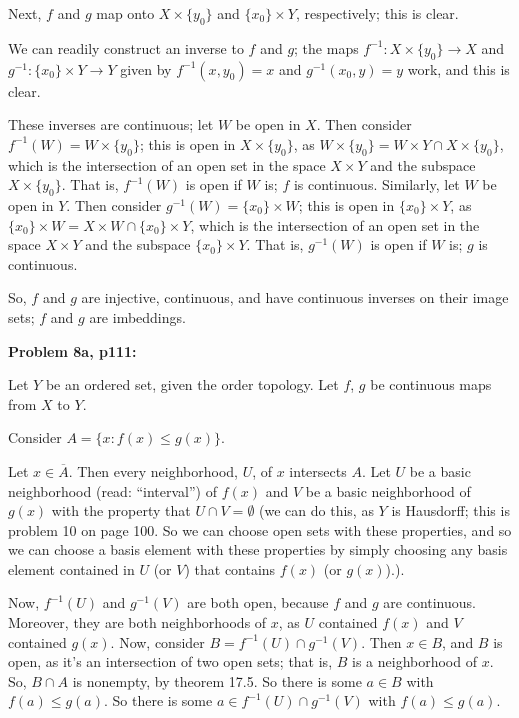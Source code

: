 \documentclass[a4paper,12pt]{article}
\begin{document}
Next, $f$ and $g$ map onto $X \times \{y_0\}$ and $\{x_0\} \times Y$, respectively; this is clear. %

We can readily construct an inverse to $f$ and $g$; the maps $f^{-1}: X \times \{y_0\} \to X$ and $g^{-1}: \{x_0\} \times Y \to Y$ given by $f^{-1}(x,y_0) = x$ and $g^{-1}(x_0,y) = y$ work, and this is clear.

These inverses are continuous; let $W$ be open in $X$. Then consider $f^{-1}(W) = W \times \{y_0\}$; this is open in $X \times \{y_0\}$, as $W \times \{y_0\} = W \times Y \cap X \times \{y_0\}$, which is the intersection of an open set in the space $X \times Y$ and the subspace $X \times \{y_0\}$. That is, $f^{-1}(W)$ is open if $W$ is; $f$ is continuous. Similarly, let $W$ be open in $Y$. Then consider $g^{-1}(W) = \{x_0\} \times W$; this is open in $\{x_0\} \times Y$, as $\{x_0\} \times W = X \times W \cap \{x_0\} \times Y$, which is the intersection of an open set in the space $X \times Y$ and the subspace $\{x_0\} \times Y$. That is, $g^{-1}(W)$ is open if $W$ is; $g$ is continuous.

So, $f$ and $g$ are injective, continuous, and have continuous inverses on their image sets; $f$ and $g$ are imbeddings. 


\shunt

{\bf Problem 8a, p111:}

Let $Y$ be an ordered set, given the order topology. Let $f$, $g$ be continuous maps from $X$ to $Y$.

Consider $A = \{x: f(x) \leq g(x)\}$.

Let $x \in \overline{A}$. Then every neighborhood, $U$, of $x$ intersects $A$. Let $U$ be a basic neighborhood (read: ``interval'') of $f(x)$ and $V$ be a basic neighborhood of $g(x)$ with the property that $U \cap V = \emptyset$ (we can do this, as $Y$ is Hausdorff; this is problem 10 on page 100. So we can choose open sets with these properties, and so we can choose a basis element with these properties by simply choosing any basis element contained in $U$ (or $V$) that contains $f(x)$ (or $g(x)$).). 

Now, $f^{-1}(U)$ and $g^{-1}(V)$ are both open, because $f$ and $g$ are continuous. Moreover, they are both neighborhoods of $x$, as $U$ contained $f(x)$ and $V$ contained $g(x)$. Now, consider $B = f^{-1}(U) \cap g^{-1}(V)$. Then $x \in B$, and $B$ is open, as it's an intersection of two open sets; that is, $B$ is a neighborhood of $x$. So, $B \cap A$ is nonempty, by theorem 17.5. So there is some $a \in B$ with $f(a) \leq g(a)$. So there is some $a \in f^{-1}(U) \cap g^{-1}(V)$ with $f(a) \leq g(a)$. 
\end{document}
